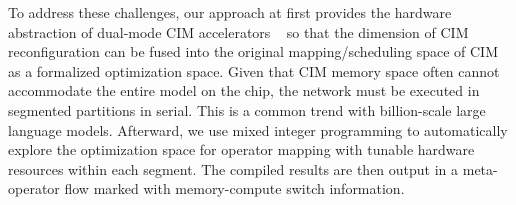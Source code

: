 To address these challenges, our approach at first provides the hardware abstraction of dual-mode CIM accelerators ~\cite{qu2024cim} so that the dimension of CIM reconfiguration can be fused into the original mapping/scheduling space of CIM as a formalized optimization space.
 Given that CIM memory space often cannot accommodate the entire model on the chip, the network must be executed in segmented partitions in serial. This is a common trend with billion-scale large language models.
Afterward, we use mixed integer programming to automatically explore the optimization space for operator mapping with tunable hardware resources within each segment. The compiled results are then output in a meta-operator flow marked with memory-compute switch information. 

